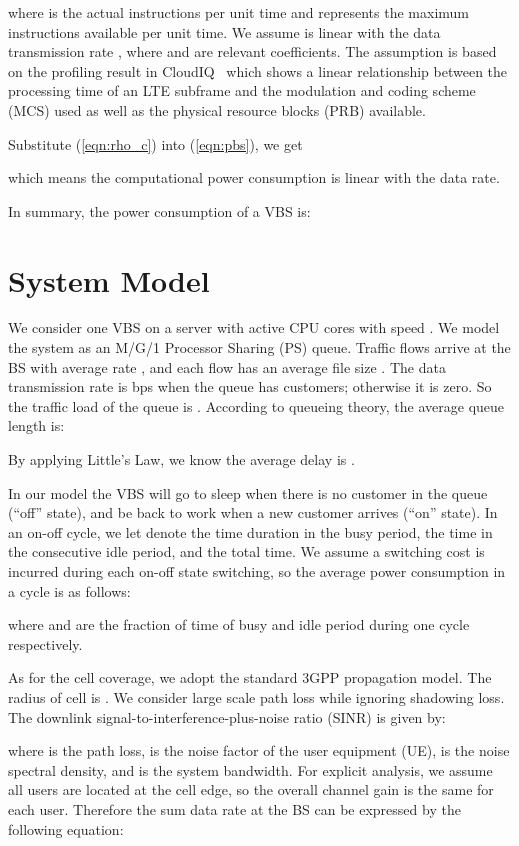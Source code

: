 \documentclass[conference]{IEEEtran}
\begin{document}
where  is the actual instructions per unit
time and  represents the maximum instructions available per unit time.
We assume  is linear with the data transmission rate , where
 and  are relevant coefficients.
The assumption is based on the profiling result
in CloudIQ~\cite{bhaumik2012cloudiq} which shows
a linear relationship between
the processing time of an LTE subframe and the modulation and coding scheme (MCS)
used as well as the physical resource blocks (PRB) available.

Substitute (\ref{eqn:rho_c}) into (\ref{eqn:pbs}), we get

which means the computational power consumption is linear with the data rate.

In summary, the power consumption of a VBS is:


\section{System Model}
\label{sec:sysmodel}

We consider one VBS on a server with  active CPU cores with speed .
We model the system as an M/G/1 Processor Sharing (PS) queue.
Traffic flows arrive at the BS with average rate , and each flow has
an average file size .
The data transmission rate is  \si{bps} when the queue has customers;
otherwise it is zero.
So the traffic load of the queue is .
According to queueing theory, the average queue length is:

By applying Little's Law, we know the average delay is .

In our model the VBS will go to sleep when there is no customer in the queue (``off''
state), and be back to work when a new customer arrives (``on'' state).
In an on-off cycle, we let  denote the time
duration in the busy period,  the time in the consecutive idle period,
and  the total time.
We assume a switching cost  is incurred during each on-off state
switching, so the average power consumption in a cycle is as follows:

where  and  are the fraction of time of busy
and idle period during one cycle respectively.

As for the cell coverage, we adopt the standard 3GPP propagation model.
The radius of cell is . We consider large scale path loss while ignoring
shadowing loss. The downlink signal-to-interference-plus-noise ratio (SINR)
is given by:

where  is the path loss,  is the noise factor of the user equipment
(UE),  is the
noise spectral density, and  is the system bandwidth.
For explicit analysis, we assume all users are located at the cell
edge, so the overall channel gain  is the same for each user.
Therefore the sum data rate at the BS can be expressed by the following
equation:
\end{document}
